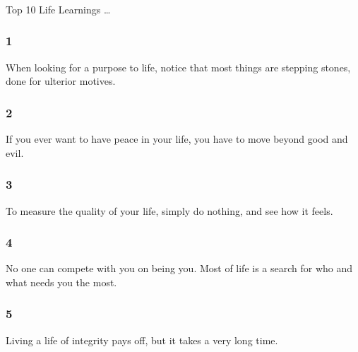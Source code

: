 \begin{frame}[fragile]\frametitle{}
\begin{center}
{\Large Top 10 Life Learnings \ldots }

\end{center}
\end{frame}

\begin{frame}[fragile]\frametitle{1}
\begin{center}
When looking for a purpose to life, notice that most things are stepping stones, done for ulterior motives.
\end{center}
\end{frame}

\begin{frame}[fragile]\frametitle{2}
\begin{center}
If you ever want to have peace in your life, you have to move beyond good and evil.
\end{center}
\end{frame}

\begin{frame}[fragile]\frametitle{3}
\begin{center}
 To measure the quality of your life, simply do nothing, and see how it feels.
\end{center}
\end{frame}

\begin{frame}[fragile]\frametitle{4}
\begin{center}
No one can compete with you on being you. Most of life is a search for who and what needs you the most.
\end{center}
\end{frame}

\begin{frame}[fragile]\frametitle{5}
\begin{center}
Living a life of integrity pays off, but it takes a very long time.
\end{center}
\end{frame}

